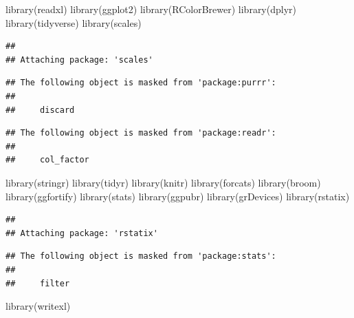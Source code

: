 \documentclass[
]{book}
\newenvironment{Shaded}{\begin{snugshade}}{\end{snugshade}}
\newcommand{\FunctionTok}[1]{\textcolor[rgb]{0.00,0.00,0.00}{#1}}
\newcommand{\NormalTok}[1]{#1}
\begin{document}
\begin{Shaded}
\begin{Highlighting}[]
\FunctionTok{library}\NormalTok{(readxl)}
\FunctionTok{library}\NormalTok{(ggplot2)}
\FunctionTok{library}\NormalTok{(RColorBrewer)}
\FunctionTok{library}\NormalTok{(dplyr)}
\FunctionTok{library}\NormalTok{(tidyverse)}
\FunctionTok{library}\NormalTok{(scales)}
\end{Highlighting}
\end{Shaded}

\begin{verbatim}
## 
## Attaching package: 'scales'
\end{verbatim}

\begin{verbatim}
## The following object is masked from 'package:purrr':
## 
##     discard
\end{verbatim}

\begin{verbatim}
## The following object is masked from 'package:readr':
## 
##     col_factor
\end{verbatim}

\begin{Shaded}
\begin{Highlighting}[]
\FunctionTok{library}\NormalTok{(stringr)}
\FunctionTok{library}\NormalTok{(tidyr)}
\FunctionTok{library}\NormalTok{(knitr)}
\FunctionTok{library}\NormalTok{(forcats)}
\FunctionTok{library}\NormalTok{(broom)}
\FunctionTok{library}\NormalTok{(ggfortify)}
\FunctionTok{library}\NormalTok{(stats)}
\FunctionTok{library}\NormalTok{(ggpubr)}
\FunctionTok{library}\NormalTok{(grDevices)}
\FunctionTok{library}\NormalTok{(rstatix)}
\end{Highlighting}
\end{Shaded}

\begin{verbatim}
## 
## Attaching package: 'rstatix'
\end{verbatim}

\begin{verbatim}
## The following object is masked from 'package:stats':
## 
##     filter
\end{verbatim}

\begin{Shaded}
\begin{Highlighting}[]
\FunctionTok{library}\NormalTok{(writexl)}
\end{Highlighting}
\end{Shaded}
\end{document}
